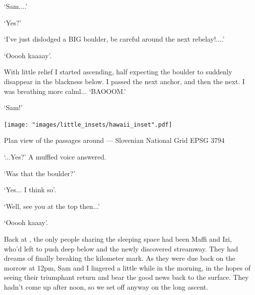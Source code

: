 `Sam....'

`Yes?'

`I've just dislodged a BIG boulder, be careful around the next rebelay!....'

`Ooooh kaaaay'.

 With little relief I started ascending, half expecting the boulder to suddenly disappear in the blackness below. I passed the next anchor, and then the next. I was breathing more calml... 
`BAOOOM.'

`Sam!'

\begin{marginsurvey}
	\texttt{[image: "images/little\_insets/hawaii\_inset".pdf]}
	\caption[Stuck in Paradise]{Plan view of the passages around \protect{} --- Slovenian National Grid EPSG 3794}
\end{marginsurvey}

`...Yes?' A muffled voice answered. 

`Was that the boulder?'

`Yes... I think so'.

`Well, see you at the top then...'

`Ooooh kaaay'.

Back at , the only people sharing the sleeping space had been Maffi and Izi, who'd left to push deep below  and the newly discovered  streamway. They had dreams of finally breaking the kilometer mark. As they were due back on the morrow at 12pm, Sam and I lingered a little while in the morning, in the hopes of seeing their triumphant return and bear the good news back to the surface. They hadn't come up after noon, so we set off anyway on the long ascent. 


